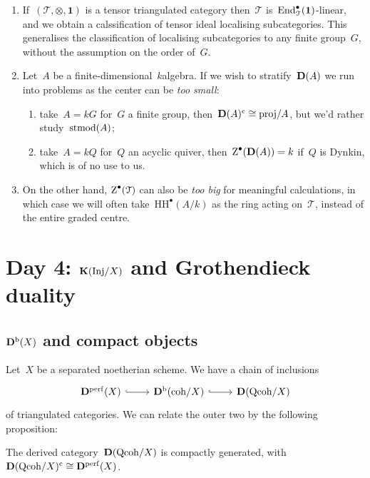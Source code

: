 \documentclass[10pt,a4paper]{article}
\begin{document}
\begin{example}
  \begin{enumerate}
    \item If~$(\mathcal{T},\otimes,\mathbf{1})$ is a tensor triangulated category then~$\mathcal{T}$ is~$\operatorname{End}_{\mathcal{T}}^\bullet(\mathbf{1})$-linear, and we obtain a calssification of tensor ideal localising subcategories. This generalises the classification of localising subcategories to any finite group~$G$, without the assumption on the order of~$G$.
    \item Let~$A$ be a finite-dimensional~$k$\dash algebra. If we wish to stratify~$\mathbf{D}(A)$ we run into problems as the center can be \emph{too small}:
      \begin{enumerate}
        \item take~$A=kG$ for~$G$ a finite group, then~$\mathbf{D}(A)^{\mathrm{c}}\cong\mathrm{proj}/A$, but we'd rather study~$\operatorname{stmod}(A)$;
        \item take~$A=kQ$ for~$Q$ an acyclic quiver, then~$\operatorname{Z}^\bullet(\mathbf{D}(A))=k$ if~$Q$ is Dynkin, which is of no use to us.
      \end{enumerate}
    \item On the other hand, $\operatorname{Z}^\bullet(\mathcal{T})$ can also be \emph{too big} for meaningful calculations, in which case we will often take~$\mathrm{HH}^\bullet(A/k)$ as the ring acting on~$\mathcal{T}$, instead of the entire graded centre.
  \end{enumerate}
\end{example}


\section{Day 4: \texorpdfstring{$\mathbf{K}(\mathrm{Inj}/X)$}{K(Inj/X)} and Grothendieck duality}
\subsection{\texorpdfstring{$\mathbf{D}^{\mathrm{b}}(X)$}{Db(X)} and compact objects}
Let~$X$ be a separated noetherian scheme. We have a chain of inclusions
\begin{equation}
  \begin{tikzcd}
    \derived^\perf(X) \arrow[hook]{r} & \derived^\bounded(\coh/X) \arrow[hook]{r} & \derived(\Qcoh/X)
  \end{tikzcd}
\end{equation}
of triangulated categories. We can relate the outer two by the following proposition:
\begin{proposition}
  The derived category~$\mathbf{D}(\mathrm{Qcoh}/X)$ is compactly generated, with $\mathbf{D}(\mathrm{Qcoh}/X)^{\mathrm{c}}\cong\mathbf{D}^{\mathrm{perf}}(X)$.
\end{proposition}
\end{document}
